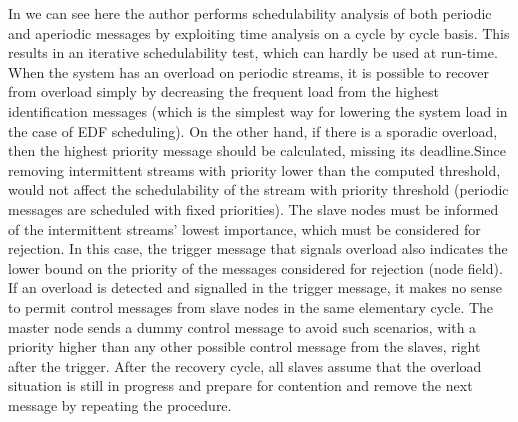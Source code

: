\documentclass[conference]{IEEEtran}
\begin{document}
In \cite{inproceedings} we can see here the author performs schedulability analysis of both periodic and aperiodic messages by exploiting time analysis on a cycle by cycle basis. This results in an iterative schedulability test, which can hardly be used at run-time. When the system has an overload on periodic streams, it is possible to recover from overload simply by decreasing the frequent load from the highest identification messages (which is the simplest way for lowering the system load in the case of EDF scheduling). On the other hand, if there is a sporadic overload, then the highest priority message should be calculated, missing its deadline.Since removing intermittent streams with priority lower than the computed threshold, would not affect the schedulability of the stream with priority threshold (periodic messages are scheduled with fixed priorities). The slave nodes must be informed of the intermittent streams' lowest importance, which must be considered for rejection. In this case, the trigger message that signals overload also indicates the lower bound on the priority of the messages considered for rejection (node field).
If an overload is detected and signalled in the trigger message, it makes no sense to permit control messages from slave nodes in the same elementary cycle. The master node sends a dummy control message to avoid such scenarios, with a priority higher than any other possible control message from the slaves, right after the trigger. After the recovery cycle, all slaves assume that the overload situation is still in progress and prepare for contention and remove the next message by repeating the procedure.
\end{document}
